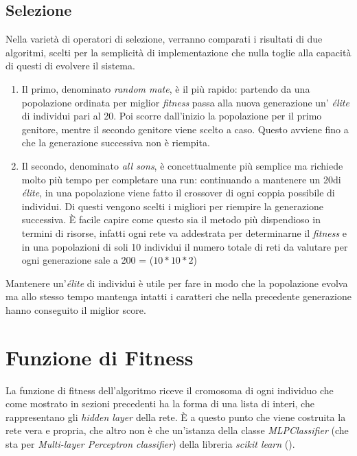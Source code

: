 \documentclass[12pt,a4paper]{report}
\begin{document}
\subsection{Selezione}

Nella varietà di operatori di selezione, verranno comparati i risultati di due algoritmi, scelti per la semplicità di implementazione che nulla toglie alla capacità di questi di evolvere il sistema.

\begin{enumerate}
 \item Il primo, denominato \textit{random mate}, è il più rapido: partendo da una popolazione ordinata per miglior \textit{fitness} passa alla nuova generazione un' \textit{élite} di individui pari al 20\textdiscount.
 Poi scorre dall'inizio la popolazione per il primo genitore, mentre il secondo genitore viene scelto a caso. 
 Questo avviene fino a che la generazione successiva non è riempita.
 
 \item Il secondo, denominato \textit{all sons}, è concettualmente più semplice ma richiede molto più tempo per completare una run: continuando a mantenere un 20\textdiscount di \textit{élite}, in una popolazione viene fatto il crossover di ogni coppia possibile di individui.
 Di questi vengono scelti i migliori per riempire la generazione successiva.
 È facile capire come questo sia il metodo più dispendioso in termini di risorse, infatti ogni rete va addestrata per determinarne il \textit{fitness} e in una popolazioni di soli 10 individui il numero totale di reti da valutare per ogni generazione sale a 200 =  ($10*10*2$)
 
\end{enumerate}

Mantenere un'\textit{élite} di individui è utile per fare in modo che la popolazione evolva ma allo stesso tempo mantenga intatti i caratteri che nella precedente generazione hanno conseguito il miglior score.

\section{Funzione di Fitness}

La funzione di fitness dell'algoritmo riceve il cromosoma di ogni individuo che come mostrato in sezioni precedenti ha la forma di una lista di interi, che rappresentano gli \textit{hidden layer} della rete.
È a questo punto che viene costruita la rete vera e propria, che altro non è che un'istanza della classe \textit{MLPClassifier} (che sta per \textit{Multi-layer Perceptron classifier}) della libreria \textit{scikit learn} (\cite{scikit-learn}).
\end{document}
